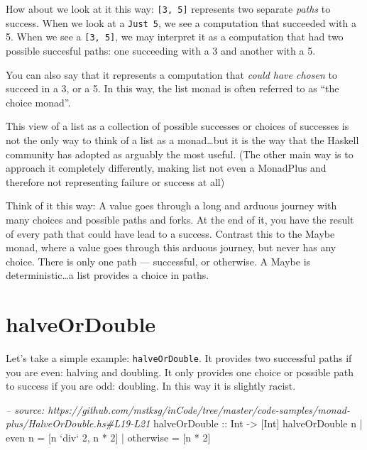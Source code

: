 \documentclass[]{article}
\newenvironment{Shaded}{}{}
\newcommand{\DataTypeTok}[1]{\textcolor[rgb]{0.56,0.13,0.00}{#1}}
\newcommand{\DecValTok}[1]{\textcolor[rgb]{0.25,0.63,0.44}{#1}}
\newcommand{\CommentTok}[1]{\textcolor[rgb]{0.38,0.63,0.69}{\textit{#1}}}
\newcommand{\OtherTok}[1]{\textcolor[rgb]{0.00,0.44,0.13}{#1}}
\newcommand{\FunctionTok}[1]{\textcolor[rgb]{0.02,0.16,0.49}{#1}}
\newcommand{\NormalTok}[1]{#1}
\begin{document}
How about we look at it this way: \texttt{{[}3,\ 5{]}} represents two separate
\emph{paths} to success. When we look at a \texttt{Just\ 5}, we see a
computation that succeeded with a 5. When we see a \texttt{{[}3,\ 5{]}}, we may
interpret it as a computation that had two possible succesful paths: one
succeeding with a 3 and another with a 5.

You can also say that it represents a computation that \emph{could have chosen}
to succeed in a 3, or a 5. In this way, the list monad is often referred to as
``the choice monad''.

This view of a list as a collection of possible successes or choices of
successes is not the only way to think of a list as a monad\ldots{}but it is the
way that the Haskell community has adopted as arguably the most useful. (The
other main way is to approach it completely differently, making list not even a
MonadPlus and therefore not representing failure or success at all)

Think of it this way: A value goes through a long and arduous journey with many
choices and possible paths and forks. At the end of it, you have the result of
every path that could have lead to a success. Contrast this to the Maybe monad,
where a value goes through this arduous journey, but never has any choice. There
is only one path --- successful, or otherwise. A Maybe is deterministic\ldots{}a
list provides a choice in paths.

\section{halveOrDouble}\label{halveordouble}

Let's take a simple example: \texttt{halveOrDouble}. It provides two successful
paths if you are even: halving and doubling. It only provides one choice or
possible path to success if you are odd: doubling. In this way it is slightly
racist.

\begin{Shaded}
\begin{Highlighting}[]
\CommentTok{-- source: https://github.com/mstksg/inCode/tree/master/code-samples/monad-plus/HalveOrDouble.hs#L19-L21}
\OtherTok{halveOrDouble ::} \DataTypeTok{Int} \OtherTok{->}\NormalTok{ [}\DataTypeTok{Int}\NormalTok{]}
\NormalTok{halveOrDouble n }\FunctionTok{|}\NormalTok{ even n    }\FunctionTok{=}\NormalTok{ [n }\OtherTok{`div`} \DecValTok{2}\NormalTok{, n }\FunctionTok{*} \DecValTok{2}\NormalTok{]}
                \FunctionTok{|}\NormalTok{ otherwise }\FunctionTok{=}\NormalTok{ [n }\FunctionTok{*} \DecValTok{2}\NormalTok{]}
\end{Highlighting}
\end{Shaded}
\end{document}

